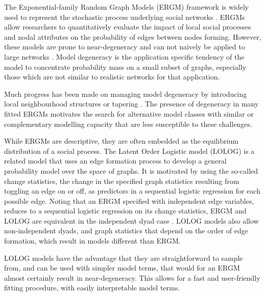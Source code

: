 \documentclass[
]{statsoc}
\begin{document}
The Exponential-family Random Graph Models (ERGM) framework is widely
used to represent the stochastic process underlying social networks
\citep{FrankStrauss1986,Hunter2006}. ERGMs allow researchers to
quantitatively evaluate the impact of local social processes and nodal
attributes on the probability of edges between nodes forming. However,
these models are prone to near-degeneracy \citep{Handcock2003} and can
not naively be applied to large networks
\citep{schweinberger2011,chatterjee2013}. Model degeneracy is the
application specific tendency of the model to concentrate probability
mass on a small subset of graphs, especially those which are not similar
to realistic networks for that application.

Much progress has been made on managing model degeneracy by introducing
local neighbourhood structures \citep{schweinbergerhandcock2015} or
tapering \citep{fellowshandcock2017}. The presence of degeneracy in many
fitted ERGMs motivates the search for alternative model classes with
similar or complementary modelling capacity that are less susceptible to
these challenges.

While ERGMs are descriptive, they are often embedded as the equilibrium
distribution of a social process. The Latent Order Logistic model
(LOLOG) \citep{Fellows2018} is a related model that uses an edge
formation process to develop a general probability model over the space
of graphs. It is motivated by using the so-called change statistics, the
change in the specified graph statistics resulting from toggling an edge
on or off, as predictors in a sequential logistic regression for each
possible edge. Noting that an ERGM specified with independent edge
variables, reduces to a sequential logistic regression on its change
statistics, ERGM and LOLOG are equivalent in the independent dyad case
\citep{Fellows2018}. LOLOG models also allow non-independent dyads, and
graph statistics that depend on the order of edge formation, which
result in models different than ERGM.

LOLOG models have the advantage that they are straightforward to sample
from, and can be used with simpler model terms, that would for an ERGM
almost certainly result in near-degeneracy. This allows for a fast and
user-friendly fitting procedure, with easily interpretable model terms.
\end{document}
